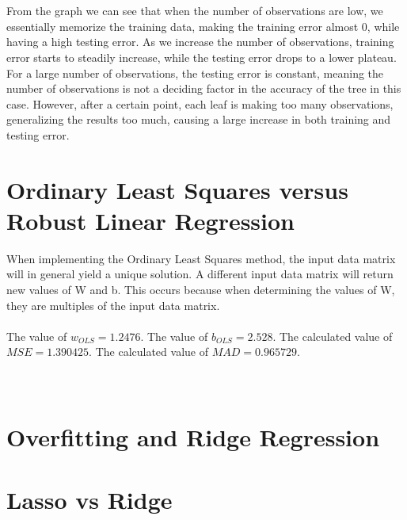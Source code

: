 \documentclass[paper=a4, fontsize=11pt]{scrartcl} %
\numberwithin{equation}{section} %
\numberwithin{figure}{section} %
\numberwithin{table}{section} %
\begin{document}
	\\\\
	From the graph we can see that when the number of observations are low, we essentially memorize the training data, making the training error almost 0, while having a high testing error. As we increase the number of observations, training error starts to steadily increase, while the testing error drops to a lower plateau. For a large number of observations, the testing error is constant, meaning the number of observations is not a deciding factor in the accuracy of the tree in this case. However, after a certain point, each leaf is making too many observations, generalizing the results too much, causing a large increase in both training and testing error.
	\newpage
	\section{Ordinary Least Squares versus Robust Linear Regression}
	When implementing the Ordinary Least Squares method, the input data matrix will in general yield a unique solution. A different input data matrix will return new values of W and b. This occurs because when determining the values of W, they are multiples of the input data matrix.
	\\\\
	The value of $w_{OLS} = 1.2476$. The value of $b_{OLS} = 2.528$. The calculated value of $MSE = 1.390425$. The calculated value of $MAD = 0.965729$.
	\\\\\\
	
	
	
	\newpage
	\section{Overfitting and Ridge Regression}
	
	\newpage
	\section{Lasso vs Ridge}
	
\end{document}
